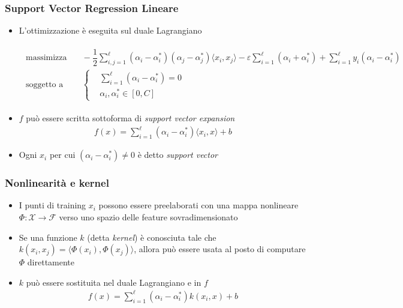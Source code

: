\documentclass[table]{beamer}
\begin{document}
\begin{frame}
\frametitle{Support Vector Regression Lineare}
\begin{itemize}
\item L'ottimizzazione è eseguita sul duale Lagrangiano
\begin{scriptsize}
\begin{align*}
\begin{aligned}
\text{massimizza} &\quad
-\dfrac{1}{2}\sum_{i,j=1}^{\ell}(\alpha_{i} - \alpha_{i}^{*})(\alpha_{j} - \alpha_{j}^{*})\langle x_{i},x_{j} \rangle -\varepsilon\sum_{i=1}^{\ell}(\alpha_{i} + \alpha_{i}^{*}) + \sum_{i=1}^{\ell}y_{i}(\alpha_{i}-\alpha_{i}^{*}) \\
\text{soggetto a} &\quad \left\{\begin{aligned}
&\sum_{i=1}^{\ell}(\alpha_{i} - \alpha_{i}^{*}) = 0\\
&\alpha_{i},\alpha_{i}^{*} \in [0,C]
\end{aligned}\right.
\end{aligned}
\end{align*}
\end{scriptsize}
\item $ f $ può essere scritta sottoforma di \textit{support vector expansion}
\begin{align*}
f(x) = \sum_{i=1}^{\ell}(\alpha_{i}-\alpha_{i}^{*})\langle x_{i},x\rangle + b
\end{align*}
\item Ogni $ x_{i} $ per cui $ (\alpha_{i}-\alpha_{i}^{*}) \neq 0 $ è detto \textit{support vector}
\end{itemize}
\end{frame}


\begin{frame}
\frametitle{Nonlinearità e kernel}
\begin{itemize}
\item I punti di training $ x_{i} $ possono essere preelaborati con una mappa nonlineare $ \Phi : \mathcal{X} \rightarrow \mathcal{F} $ verso uno spazio delle feature sovradimensionato
\item Se una funzione $ k $ (detta \textit{kernel}) è conosciuta tale che $ k(x_{i},x_{j}) = \langle\Phi (x_{i}),\Phi (x_{j})\rangle $, allora può essere usata al posto di computare $ \Phi $ direttamente
\item $k$ può essere sostituita nel duale Lagrangiano e in $f$
\begin{align*}
f(x) = \sum_{i=1}^{\ell}(\alpha_{i}-\alpha_{i}^{*})k(x_{i},x) + b
\end{align*}
\end{itemize}
\end{frame}
\end{document}

